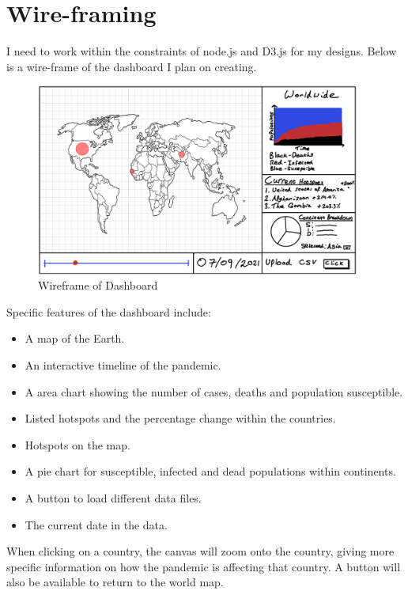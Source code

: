 \documentclass{report}
\begin{document}
\section{Wire-framing}
I need to work within the constraints of node.js and D3.js for my designs. Below is a wire-frame of the dashboard I plan on creating.
\begin{center}
    \begin{figure}[h]
        \centering
        \includegraphics[width=0.95\textwidth]{Images/Home_Wireframe.png}
        \caption{Wireframe of Dashboard}
        \label{fig:wireframe_world}
    \end{figure}
\end{center}
Specific features of the dashboard include:
\begin{itemize}
    \item A map of the Earth.
    \item An interactive timeline of the pandemic.
    \item A area chart showing the number of cases, deaths and population susceptible.
    \item Listed hotspots and the percentage change within the countries.
    \item Hotspots on the map.
    \item A pie chart for susceptible, infected and dead populations within continents.
    \item A button to load different data files.
    \item The current date in the data.
\end{itemize}
When clicking on a country, the canvas will zoom onto the country, giving more specific information on how the pandemic is affecting that country. A button will also be available to return to the world map.
\end{document}
